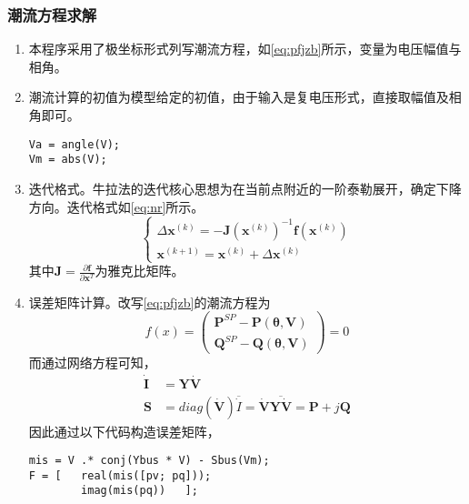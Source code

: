 \documentclass[a4paper,12pt]{article}
\newcommand{\vect}[1]{\boldsymbol{#1}}
\begin{document}
    \subsubsection{潮流方程求解}
    \begin{enumerate}
      \item 本程序采用了极坐标形式列写潮流方程，如\cref{eq:pfjzb}所示，变量为电压幅值与相角。
      \item 潮流计算的初值为模型给定的初值，由于输入是复电压形式，直接取幅值及相角即可。
      \begin{lstlisting}[style=Matlab-editor,basicstyle=\mlttfamily]
Va = angle(V);
Vm = abs(V);
      \end{lstlisting}
      \item 迭代格式。牛拉法的迭代核心思想为在当前点附近的一阶泰勒展开，确定下降方向。迭代格式如\cref{eq:nr}所示。
\begin{equation}
  \label{eq:nr}
  \begin{cases}
    \Delta \vect{x}^{(k)} = -\vect{J}(\vect{x}^{(k)})^{-1}\vect{f}(\vect{x}^{(k)})\\
    \vect{x}^{(k+1)}=\vect{x}^{(k)}+\Delta \vect{x}^{(k)}
  \end{cases}
\end{equation}
      其中$\vect{J}=\frac{\partial \vect{f}}{\partial \vect{x}^T}$为雅克比矩阵。
      \item 误差矩阵计算。改写\cref{eq:pfjzb}的潮流方程为
      \begin{equation}
        f(x) = \begin{pmatrix}
          \vect{P}^{SP}-\vect{P}(\vect{\theta},\vect{V})\\
          \vect{Q}^{SP}-\vect{Q}(\vect{\theta},\vect{V})
      \end{pmatrix} = 0
      \end{equation}
      而通过网络方程可知，
      \begin{equation}
        \begin{aligned}
          \vect{\dot{I}} &= \vect{Y\dot{V}}\\
          \vect{S}&=diag(\vect{\dot{V}})\overline{\dot{I}}=\vect{\dot{V}}\overline{\vect{Y\dot{V}}}=\vect{P}+j\vect{Q}
        \end{aligned}
      \end{equation}
      因此通过以下代码构造误差矩阵，
      \begin{lstlisting}[style=Matlab-editor,basicstyle=\mlttfamily]
mis = V .* conj(Ybus * V) - Sbus(Vm);
F = [   real(mis([pv; pq]));
        imag(mis(pq))   ];

\end{lstlisting}
\end{enumerate}
\end{document}
